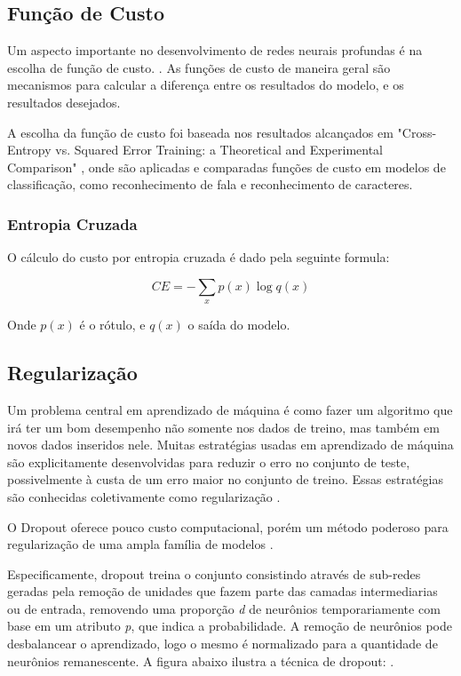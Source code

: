 \documentclass[12pt]{article}
\begin{document}
\subsection{Função de Custo}

Um aspecto importante no desenvolvimento de redes neurais profundas é na escolha de função de custo. \cite{Goodfellow-et-al-2016}. As funções de custo de maneira geral são mecanismos para calcular a diferença entre os resultados do modelo, e os resultados desejados.

A escolha da função de custo foi baseada nos resultados alcançados em "Cross-Entropy vs. Squared Error Training: a Theoretical and Experimental Comparison" \cite{golik:2013}, onde são aplicadas e comparadas funções de custo em modelos de classificação, como reconhecimento de fala e reconhecimento de caracteres.

\subsubsection{Entropia Cruzada}

O cálculo do custo por entropia cruzada é dado pela seguinte formula:

\begin{equation}
    CE = -\sum\limits_{x} p(x)\log q(x)
\end{equation}

Onde $p(x)$ é o rótulo, e $q(x)$ o saída do modelo.
\subsection{Regularização}

Um problema central em aprendizado de máquina é como fazer um algoritmo que irá ter um bom desempenho não somente nos dados de treino, mas também em novos dados inseridos nele. Muitas estratégias usadas em aprendizado de máquina são explicitamente desenvolvidas para reduzir o erro no conjunto de teste, possivelmente à custa de um erro maior no conjunto de treino. Essas estratégias são conhecidas coletivamente como regularização \cite{Goodfellow-et-al-2016}.

O Dropout oferece pouco custo computacional, porém um método poderoso para regularização de uma ampla família de modelos \cite{DBLP:journals/corr/abs-1207-0580}.

Especificamente, dropout treina o conjunto consistindo através de sub-redes geradas pela remoção de unidades que fazem parte das camadas intermediarias ou de entrada, removendo uma proporção \textit{d} de neurônios temporariamente com base em um atributo \textit{p}, que indica a probabilidade. A remoção de neurônios pode desbalancear o aprendizado, logo o mesmo é normalizado para a quantidade de neurônios remanescente. A figura abaixo ilustra a técnica de dropout: \cite{Goodfellow-et-al-2016}.
\end{document}
